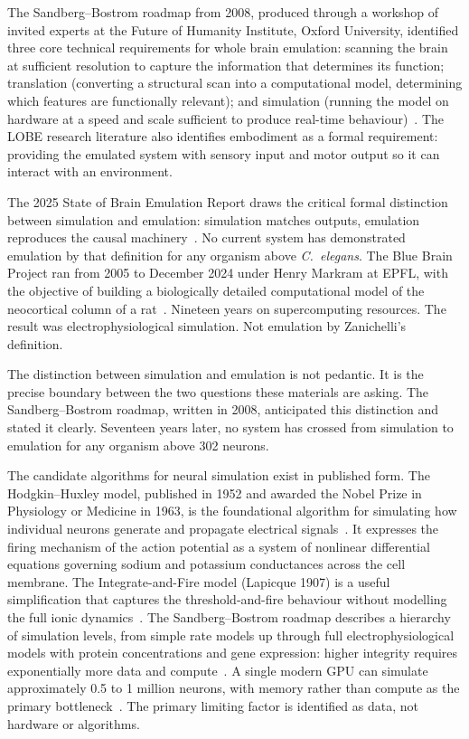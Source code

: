 \documentclass[12pt, a4paper]{article}
\begin{document}
The Sandberg--Bostrom roadmap from 2008, produced through a workshop of invited experts at the Future
of Humanity Institute, Oxford University, identified three core technical requirements for whole brain
emulation: scanning the brain at sufficient resolution to capture the information that determines its
function; translation (converting a structural scan into a computational model, determining which
features are functionally relevant); and simulation (running the model on hardware at a speed and
scale sufficient to produce real-time behaviour)~\cite{Bio-7}. The LOBE research literature also
identifies embodiment as a formal requirement: providing the emulated system with sensory input and
motor output so it can interact with an environment.

The 2025 State of Brain Emulation Report draws the critical formal distinction between simulation and
emulation: simulation matches outputs, emulation reproduces the causal machinery~\cite{Bio-8}. No
current system has demonstrated emulation by that definition for any organism above \textit{C.\
elegans}. The Blue Brain Project ran from 2005 to December 2024 under Henry Markram at EPFL, with the
objective of building a biologically detailed computational model of the neocortical column of a
rat~\cite{Bio-7}. Nineteen years on supercomputing resources. The result was electrophysiological
simulation. Not emulation by Zanichelli's definition.

The distinction between simulation and emulation is not pedantic. It is the precise boundary between
the two questions these materials are asking. The Sandberg--Bostrom roadmap, written in 2008,
anticipated this distinction and stated it clearly. Seventeen years later, no system has crossed from
simulation to emulation for any organism above 302 neurons.

The candidate algorithms for neural simulation exist in published form. The Hodgkin--Huxley model,
published in 1952 and awarded the Nobel Prize in Physiology or Medicine in 1963, is the foundational
algorithm for simulating how individual neurons generate and propagate electrical signals~\cite{Bio-9}.
It expresses the firing mechanism of the action potential as a system of nonlinear differential
equations governing sodium and potassium conductances across the cell membrane. The
Integrate-and-Fire model (Lapicque 1907) is a useful simplification that captures the
threshold-and-fire behaviour without modelling the full ionic dynamics~\cite{Bio-10}. The
Sandberg--Bostrom roadmap describes a hierarchy of simulation levels, from simple rate models up
through full electrophysiological models with protein concentrations and gene expression: higher
integrity requires exponentially more data and compute~\cite{Bio-7}. A single modern GPU can simulate
approximately 0.5 to 1 million neurons, with memory rather than compute as the primary
bottleneck~\cite{Bio-8}. The primary limiting factor is identified as data, not hardware or
algorithms.
\end{document}
